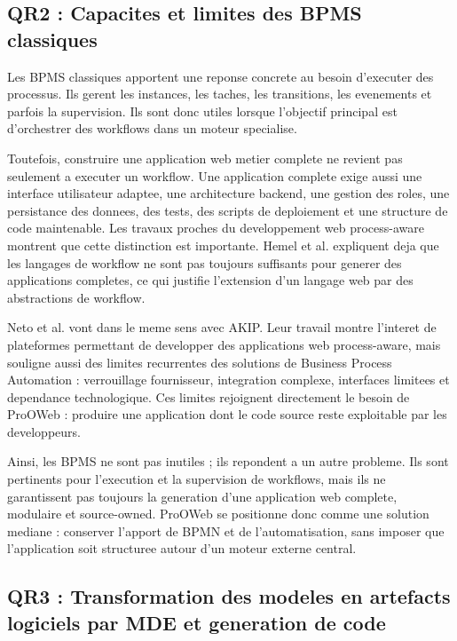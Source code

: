 \documentclass[12pt,a4paper]{article}
\begin{document}
\subsection{QR2 : Capacites et limites des BPMS classiques}

Les BPMS classiques apportent une reponse concrete au besoin d'executer des processus. Ils gerent les instances, les taches, les transitions, les evenements et parfois la supervision. Ils sont donc utiles lorsque l'objectif principal est d'orchestrer des workflows dans un moteur specialise.

Toutefois, construire une application web metier complete ne revient pas seulement a executer un workflow. Une application complete exige aussi une interface utilisateur adaptee, une architecture backend, une gestion des roles, une persistance des donnees, des tests, des scripts de deploiement et une structure de code maintenable. Les travaux proches du developpement web process-aware montrent que cette distinction est importante. Hemel et al. \cite{hemel2008} expliquent deja que les langages de workflow ne sont pas toujours suffisants pour generer des applications completes, ce qui justifie l'extension d'un langage web par des abstractions de workflow.

Neto et al. \cite{neto2022} vont dans le meme sens avec AKIP. Leur travail montre l'interet de plateformes permettant de developper des applications web process-aware, mais souligne aussi des limites recurrentes des solutions de Business Process Automation : verrouillage fournisseur, integration complexe, interfaces limitees et dependance technologique. Ces limites rejoignent directement le besoin de ProOWeb : produire une application dont le code source reste exploitable par les developpeurs.

Ainsi, les BPMS ne sont pas inutiles ; ils repondent a un autre probleme. Ils sont pertinents pour l'execution et la supervision de workflows, mais ils ne garantissent pas toujours la generation d'une application web complete, modulaire et source-owned. ProOWeb se positionne donc comme une solution mediane : conserver l'apport de BPMN et de l'automatisation, sans imposer que l'application soit structuree autour d'un moteur externe central.

\subsection{QR3 : Transformation des modeles en artefacts logiciels par MDE et generation de code}
\end{document}
